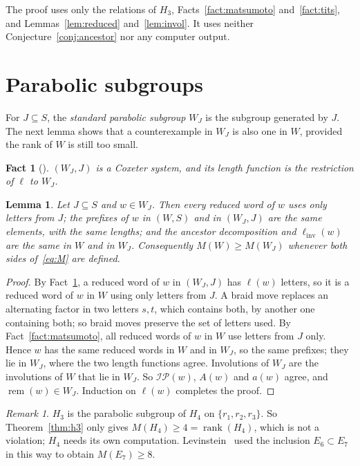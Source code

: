 \documentclass[11pt]{amsart}
\newtheorem{lemma}[theorem]{Lemma}
\newtheorem{fact}[theorem]{Fact}
\theoremstyle{definition}\newtheorem{definition}[theorem]{Definition}
\theoremstyle{remark}\newtheorem{remark}[theorem]{Remark}
\newcommand{\linv}{\ell_{\mathrm{inv}}}
\newcommand{\IP}{\mathcal{IP}}
\DeclareMathOperator{\rem}{rem}
\DeclareMathOperator{\rank}{rank}
\begin{document}
The proof uses only the relations of \(H_3\), Facts~\ref{fact:matsumoto} and~\ref{fact:tits}, and Lemmas~\ref{lem:reduced} and~\ref{lem:invol}. It uses neither Conjecture~\ref{conj:ancestor} nor any computer output.

\section{Parabolic subgroups}\label{sec:parabolic}

For \(J\subseteq S\), the \emph{standard parabolic subgroup} \(W_J\) is the subgroup generated by \(J\). The next lemma shows that a counterexample in \(W_J\) is also one in \(W\), provided the rank of \(W\) is still too small.

\begin{fact}[{\cite[\S5.5]{Hum}}]\label{fact:parabolic}
\((W_J,J)\) is a Coxeter system, and its length function is the restriction of \(\ell\) to \(W_J\).
\end{fact}

\begin{lemma}\label{lem:parabolic}
Let \(J\subseteq S\) and \(w\in W_J\). Then every reduced word of \(w\) uses only letters from \(J\); the prefixes of \(w\) in \((W,S)\) and in \((W_J,J)\) are the same elements, with the same lengths; and the ancestor decomposition and \(\linv(w)\) are the same in \(W\) and in \(W_J\). Consequently \(M(W)\ge M(W_J)\) whenever both sides of~\eqref{eq:M} are defined.
\end{lemma}

\begin{proof}
By Fact~\ref{fact:parabolic}, a reduced word of \(w\) in \((W_J,J)\) has \(\ell(w)\) letters, so it is a reduced word of \(w\) in \(W\) using only letters from \(J\). A braid move replaces an alternating factor in two letters \(s,t\), which contains both, by another one containing both; so braid moves preserve the set of letters used. By Fact~\ref{fact:matsumoto}, all reduced words of \(w\) in \(W\) use letters from \(J\) only. Hence \(w\) has the same reduced words in \(W\) and in \(W_J\), so the same prefixes; they lie in \(W_J\), where the two length functions agree. Involutions of \(W_J\) are the involutions of \(W\) that lie in \(W_J\). So \(\IP(w)\), \(A(w)\) and \(a(w)\) agree, and \(\rem(w)\in W_J\). Induction on \(\ell(w)\) completes the proof.
\end{proof}

\begin{remark}\label{rem:inheritance}
\(H_3\) is the parabolic subgroup of \(H_4\) on \(\{r_1,r_2,r_3\}\). So Theorem~\ref{thm:h3} only gives \(M(H_4)\ge4=\rank(H_4)\), which is not a violation; \(H_4\) needs its own computation. Levinstein~\cite{Lev} used the inclusion \(E_6\subset E_7\) in this way to obtain \(M(E_7)\ge 8\).
\end{remark}
\end{document}
